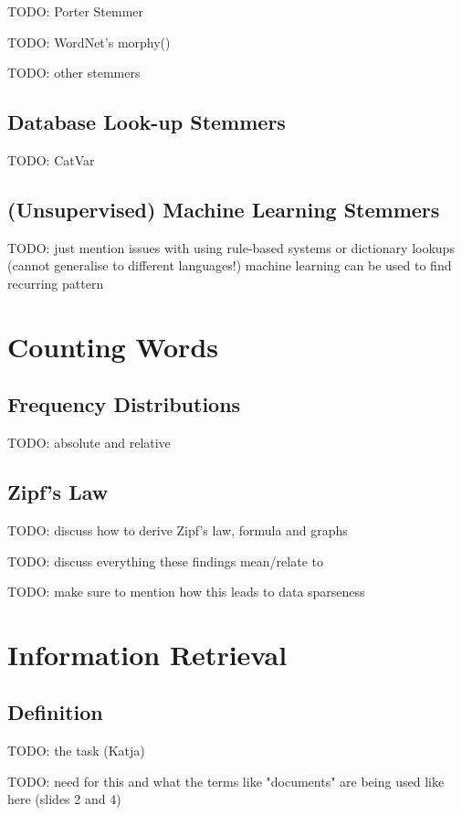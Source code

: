 \documentclass{article}
\begin{document}
TODO: Porter Stemmer

TODO: WordNet's morphy()

TODO: other stemmers

\subsection{Database Look-up Stemmers}

TODO: CatVar

\subsection{(Unsupervised) Machine Learning Stemmers}

TODO: just mention issues with using rule-based systems or dictionary lookups (cannot generalise to different languages!) machine learning can be used to find recurring pattern

\section{Counting Words}

\subsection{Frequency Distributions}

TODO: absolute and relative

\subsection{Zipf's Law}

TODO: discuss how to derive Zipf's law, formula and graphs

TODO: discuss everything these findings mean/relate to

TODO: make sure to mention how this leads to data sparseness

\section{Information Retrieval}

\subsection{Definition}

TODO: the task (Katja)

TODO: need for this and what the terms like "documents" are being used like here (slides 2 and 4)
\end{document}
